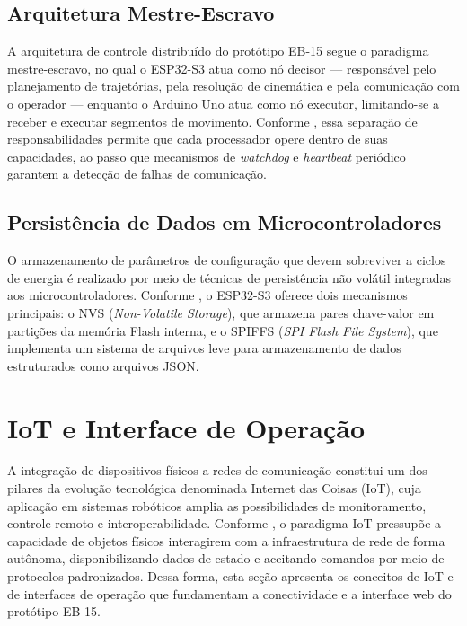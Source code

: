 \subsection{Arquitetura Mestre-Escravo}

A arquitetura de controle distribuído do protótipo EB-15 segue o paradigma mestre-escravo, no qual o ESP32-S3 atua como nó decisor — responsável pelo planejamento de trajetórias, pela resolução de cinemática e pela comunicação com o operador — enquanto o Arduino Uno atua como nó executor, limitando-se a receber e executar segmentos de movimento. Conforme , essa separação de responsabilidades permite que cada processador opere dentro de suas capacidades, ao passo que mecanismos de \textit{watchdog} e \textit{heartbeat} periódico garantem a detecção de falhas de comunicação.

\subsection{Persistência de Dados em Microcontroladores}

O armazenamento de parâmetros de configuração que devem sobreviver a ciclos de energia é realizado por meio de técnicas de persistência não volátil integradas aos microcontroladores. Conforme , o ESP32-S3 oferece dois mecanismos principais: o NVS (\textit{Non-Volatile Storage}), que armazena pares chave-valor em partições da memória Flash interna, e o SPIFFS (\textit{SPI Flash File System}), que implementa um sistema de arquivos leve para armazenamento de dados estruturados como arquivos JSON.

\section{IoT e Interface de Operação}

A integração de dispositivos físicos a redes de comunicação constitui um dos pilares da evolução tecnológica denominada Internet das Coisas (IoT), cuja aplicação em sistemas robóticos amplia as possibilidades de monitoramento, controle remoto e interoperabilidade. Conforme , o paradigma IoT pressupõe a capacidade de objetos físicos interagirem com a infraestrutura de rede de forma autônoma, disponibilizando dados de estado e aceitando comandos por meio de protocolos padronizados. Dessa forma, esta seção apresenta os conceitos de IoT e de interfaces de operação que fundamentam a conectividade e a interface web do protótipo EB-15.

